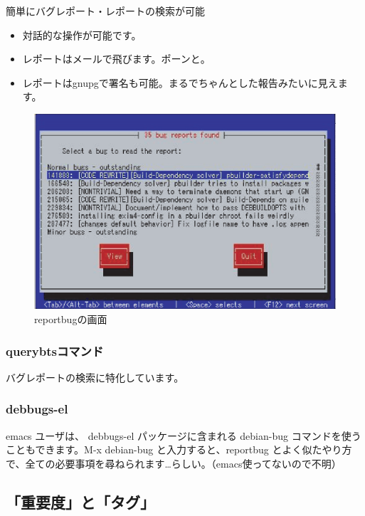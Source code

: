 \documentclass[mingoth,a4paper]{jsarticle}
\begin{document}
簡単にバグレポート・レポートの検索が可能

\begin{itemize}
\item 対話的な操作が可能です。
\item レポートはメールで飛びます。ポーンと。
\item レポートはgnupgで署名も可能。まるでちゃんとした報告みたいに見えます。
\end{itemize}

\begin{figure}[htbp]
\begin{center}
\includegraphics{image200508/reportbug.eps}
\end{center}
\caption{reportbugの画面}
\label{reportbug}
\end{figure}

\subsubsection*{querybtsコマンド}

バグレポートの検索に特化しています。

\subsubsection{debbugs-el}

emacs ユーザは、 debbugs-el パッケージに含まれる debian-bug コマンドを使うこともできます。M-x debian-bug と入力すると、reportbug とよく似たやり方で、全ての必要事項を尋ねられます…らしい。（emacs使ってないので不明）

\subsection{「重要度」と「タグ」}
\end{document}

